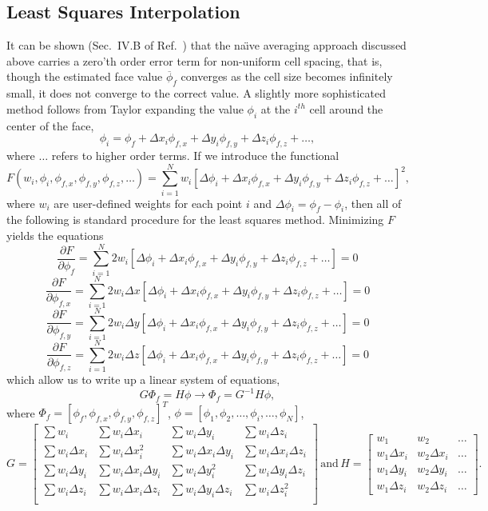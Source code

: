 \documentclass[]{article}
\newcommand{\p}{\partial}
\newcommand{\Eq}[1]{\begin{equation}#1\end{equation}}
\begin{document}
\subsection*{Least Squares Interpolation}
It can be shown (Sec.~IV.B of Ref.~\cite{Sozer2014}) that the na{\"\i}ve averaging approach discussed above carries a zero'th order error term for non-uniform cell spacing, that is, though the estimated face value $\overline{\phi}_f $ converges as the cell size becomes infinitely small, it does not converge to the correct value. A slightly more sophisticated method follows from Taylor expanding the value $\phi_i$ at the $i^{th}$ cell around the center of the face,
\Eq{\phi_i = \phi_f + \Delta x_i\phi_{f,x} + \Delta y_i\phi_{f,y} + \Delta z_i\phi_{f,z} + \dots,}
where $\dots$ refers to higher order terms. If we introduce the functional
\Eq{F(w_i,\phi_i,\phi_{f,x},\phi_{f,y},\phi_{f,z},\dots) = \sum_{i=1}^N w_i\left[\Delta\phi_i + \Delta x_i\phi_{f,x} + \Delta y_i\phi_{f,y} + \Delta z_i\phi_{f,z} + \dots\right]^2,}
where $w_i$ are user-defined weights for each point $i$ and $\Delta\phi_i = \phi_f - \phi_i$, then all of the following is standard procedure for the least squares method. Minimizing $F$ yields the equations
\Eq{\frac{\p F}{\p \phi_f} =  \sum_{i=1}^N 2 w_i\left[\Delta\phi_i + \Delta x_i\phi_{f,x} + \Delta y_i\phi_{f,y} + \Delta z_i\phi_{f,z} + \dots\right] = 0}
\Eq{\frac{\p F}{\p \phi_{f,x}} =  \sum_{i=1}^N 2 w_i\Delta x\left[\Delta\phi_i + \Delta x_i\phi_{f,x} + \Delta y_i\phi_{f,y} + \Delta z_i\phi_{f,z} + \dots\right] = 0}
\Eq{\frac{\p F}{\p \phi_{f,y}} =  \sum_{i=1}^N 2 w_i\Delta y\left[\Delta\phi_i + \Delta x_i\phi_{f,x} + \Delta y_i\phi_{f,y} + \Delta z_i\phi_{f,z} + \dots\right] = 0}
\Eq{\frac{\p F}{\p \phi_{f,z}} =  \sum_{i=1}^N 2 w_i\Delta z\left[\Delta\phi_i + \Delta x_i\phi_{f,x} + \Delta y_i\phi_{f,y} + \Delta z_i\phi_{f,z} + \dots\right] = 0}
which allow us to write up a linear system of equations,
\Eq{G\Phi_f = H\phi \rightarrow \Phi_f = G^{-1}H\phi,\label{eq:FaceLeastSquares}}
where $\Phi_f = [\phi_f,\phi_{f,x},\phi_{f,y},\phi_{f,z}]^T$, $\phi = [\phi_1,\phi_2,\dots,\phi_i,\dots,\phi_N]$,
\Eq{G =
\begin{bmatrix}
    \sum w_i       & \sum w_i \Delta x_i & \sum w_i \Delta y_i & \sum w_i \Delta z_i \\
    \sum w_i \Delta x_i      & \sum w_i \Delta x^2_i & \sum w_i \Delta x_i\Delta y_i & \sum w_i \Delta x_i\Delta z_i \\
    \sum w_i  \Delta y_i     & \sum w_i \Delta x_i\Delta y_i & \sum w_i \Delta y^2_i & \sum w_i \Delta y_i\Delta z_i \\
    \sum w_i  \Delta z_i     & \sum w_i \Delta x_i\Delta z_i & \sum w_i \Delta y_i\Delta z_i & \sum w_i \Delta z^2_i \\
\end{bmatrix}
\, \mathrm{and}\, H = 
\begin{bmatrix}
    w_{1} & w_{2} & \dots  \\
    w_{1}\Delta x_i & w_{2}\Delta x_i &  \dots \\
    w_{1}\Delta y_i & w_{2}\Delta y_i &  \dots \\
    w_{1}\Delta z_i & w_{2}\Delta z_i &  \dots
\end{bmatrix}.}
\end{document}

